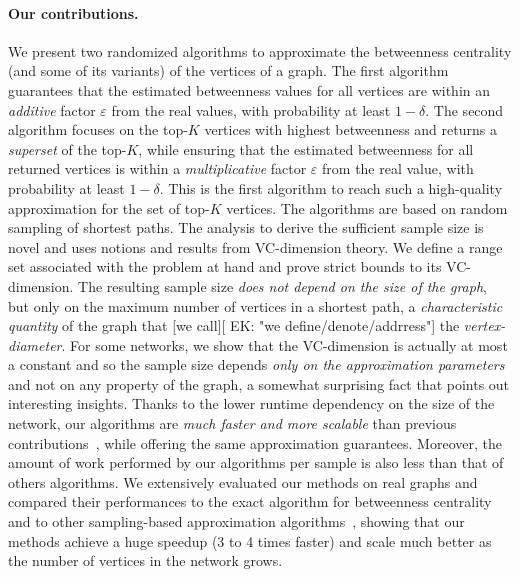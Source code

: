 \paragraph*{Our contributions\ifdmkd.\fi} 
 We present two randomized algorithms to approximate the betweenness centrality
(and some of its variants) of the vertices of a graph. The first algorithm
guarantees that the estimated betweenness values for all vertices are within an
\emph{additive} factor $\varepsilon$ from the real values, with probability at
least $1-\delta$. The second algorithm focuses on the top-$K$ vertices with
highest betweenness and returns a \emph{superset} of the top-$K$,
while ensuring that the estimated betweenness for all returned vertices is
within a \emph{multiplicative} factor $\varepsilon$ from the real value, with
probability at least $1-\delta$. This is the first algorithm to reach such a
high-quality approximation for the set of top-$K$ vertices. The algorithms are
based on random sampling of shortest paths. The analysis to derive the
sufficient sample size is novel and uses notions and results from VC-dimension
theory. We define a range set associated with the problem at hand and prove strict
bounds to its VC-dimension. The resulting sample size \emph{does not
depend on the size of the graph}, but only on the maximum number of vertices
in a shortest path, a \emph{characteristic quantity} of the graph that [we call][ EK: "we define/denote/addrress"]
the \emph{vertex-diameter}. For some networks, we show that the VC-dimension is
actually
at most a constant and so the sample size depends \emph{only on the approximation
parameters} and not on any property of the graph, a somewhat surprising fact
that points out interesting insights. Thanks to the lower runtime dependency on
the size of the network, our algorithms are \emph{much faster and more scalable}
than previous contributions~\citep{JacobKLPT05,BrandesP07,GeisbergerSS08}, while
offering the same approximation guarantees. Moreover, the amount of work
performed by our algorithms per sample is also less than that of others algorithms.
We extensively evaluated our methods on real graphs and compared their
performances to the exact algorithm for betweenness centrality~\citep{Brandes01}
and to other sampling-based approximation
algorithms~\citep{JacobKLPT05,BrandesP07,GeisbergerSS08}, showing that our
methods achieve a huge speedup (3 to 4 times faster) and scale much better as
the number of vertices in the network grows.

